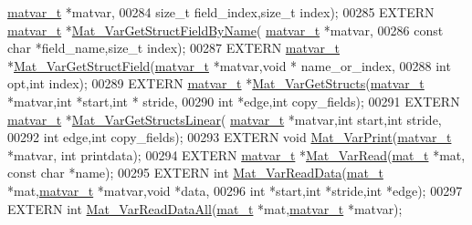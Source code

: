\begin{DoxyCode}
      \hyperlink{group___m_a_t_structmatvar__t}{matvar\_t} *matvar,
00284                       \textcolor{keywordtype}{size\_t} field\_index,\textcolor{keywordtype}{size\_t} index);
00285 EXTERN \hyperlink{group___m_a_t_structmatvar__t}{matvar\_t}  *\hyperlink{group___m_a_t_ga619d241b49ce97334a38add60562c7be}{Mat\_VarGetStructFieldByName}(
      \hyperlink{group___m_a_t_structmatvar__t}{matvar\_t} *matvar,
00286                       \textcolor{keyword}{const} \textcolor{keywordtype}{char} *field\_name,\textcolor{keywordtype}{size\_t} index);
00287 EXTERN \hyperlink{group___m_a_t_structmatvar__t}{matvar\_t}  *\hyperlink{group___m_a_t_ga7018bfe6934b96ae32e8f2a1712eefab}{Mat\_VarGetStructField}(\hyperlink{group___m_a_t_structmatvar__t}{matvar\_t} *matvar,\textcolor{keywordtype}{void} *
      name\_or\_index,
00288                       \textcolor{keywordtype}{int} opt,\textcolor{keywordtype}{int} index);
00289 EXTERN \hyperlink{group___m_a_t_structmatvar__t}{matvar\_t}  *\hyperlink{group___m_a_t_ga509178d7dc15faf9f7cd0440df6009b9}{Mat\_VarGetStructs}(\hyperlink{group___m_a_t_structmatvar__t}{matvar\_t} *matvar,\textcolor{keywordtype}{int} *start,\textcolor{keywordtype}{int} *
      stride,
00290                       \textcolor{keywordtype}{int} *edge,\textcolor{keywordtype}{int} copy\_fields);
00291 EXTERN \hyperlink{group___m_a_t_structmatvar__t}{matvar\_t}  *\hyperlink{group___m_a_t_gaa56680fb7b2cd3d410f659e945da8141}{Mat\_VarGetStructsLinear}(
      \hyperlink{group___m_a_t_structmatvar__t}{matvar\_t} *matvar,\textcolor{keywordtype}{int} start,\textcolor{keywordtype}{int} stride,
00292                       \textcolor{keywordtype}{int} edge,\textcolor{keywordtype}{int} copy\_fields);
00293 EXTERN \textcolor{keywordtype}{void}       \hyperlink{group___m_a_t_ga9100c145e338b84b55d5d0795d5d390a}{Mat\_VarPrint}(\hyperlink{group___m_a_t_structmatvar__t}{matvar\_t} *matvar, \textcolor{keywordtype}{int} printdata);
00294 EXTERN \hyperlink{group___m_a_t_structmatvar__t}{matvar\_t}  *\hyperlink{group___m_a_t_ga3505f63029763eaa73d5a19f1115eb42}{Mat\_VarRead}(\hyperlink{struct__mat__t}{mat\_t} *mat, \textcolor{keyword}{const} \textcolor{keywordtype}{char} *name);
00295 EXTERN \textcolor{keywordtype}{int}        \hyperlink{group___m_a_t_ga1845000f4fc6252ec5ff11c4b9f0759f}{Mat\_VarReadData}(\hyperlink{struct__mat__t}{mat\_t} *mat,\hyperlink{group___m_a_t_structmatvar__t}{matvar\_t} *matvar,\textcolor{keywordtype}{void} *data,
00296                       \textcolor{keywordtype}{int} *start,\textcolor{keywordtype}{int} *stride,\textcolor{keywordtype}{int} *edge);
00297 EXTERN \textcolor{keywordtype}{int}        \hyperlink{group___m_a_t_gaa8060d7c8e5da0aa9ee5f96e5f1eb30a}{Mat\_VarReadDataAll}(\hyperlink{struct__mat__t}{mat\_t} *mat,\hyperlink{group___m_a_t_structmatvar__t}{matvar\_t} *matvar);

\end{DoxyCode}
